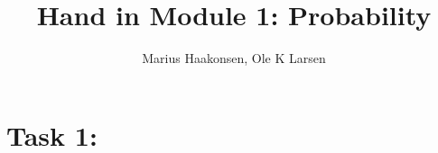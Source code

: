 \documentclass[11pt]{amsart}
\title{Hand in Module 1: Probability}
\author{Marius Haakonsen, Ole K Larsen}
\begin{document}
	
	\maketitle
	
	\section{Task 1:}
	
\end{document}
